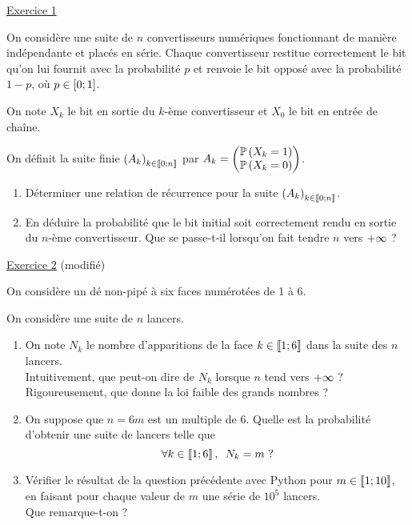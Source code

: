 \begin{corr}
\end{corr}

\begin{exo}
\underline{Exercice 1}

On considère une suite de \(n\) convertisseurs numériques fonctionnant de manière indépendante et placés en série. Chaque convertisseur restitue correctement le bit qu'on lui fournit avec la probabilité \(p\) et renvoie le bit opposé avec la probabilité \(1-p\), où \(p\in\left[0;1\right]\).

On note \(X_k\) le bit en sortie du \(k\)-ème convertisseur et \(X_0\) le bit en entrée de chaîne.

On définit la suite finie \(\left(A_k\right)_{k\in\left\llbracket0;n\right\rrbracket}\) par \(A_k=\begin{pmatrix}\mathbb{P}\left(X_k=1\right)\\\mathbb{P}\left(X_k=0\right)\end{pmatrix}\).

\begin{enumerate}
    \item Déterminer une relation de récurrence pour la suite \(\left(A_k\right)_{k\in\left\llbracket0;n\right\rrbracket}\). \\
    \item En déduire la probabilité que le bit initial soit correctement rendu en sortie du \(n\)-ème convertisseur. Que se passe-t-il lorsqu'on fait tendre \(n\) vers \(+\infty\) ?
\end{enumerate}

\underline{Exercice 2} (modifié)

On considère un dé non-pipé à six faces numérotées de 1 à 6.

On considère une suite de \(n\) lancers.

\begin{enumerate}
    \item On note \(N_k\) le nombre d'apparitions de la face \(k\in\left\llbracket1;6\right\rrbracket\) dans la suite des \(n\) lancers. \\ Intuitivement, que peut-on dire de \(N_k\) lorsque \(n\) tend vers \(+\infty\) ? \\ Rigoureusement, que donne la loi faible des grands nombres ? \\
    \item On suppose que \(n=6m\) est un multiple de \(6\). Quelle est la probabilité d'obtenir une suite de lancers telle que \[\quantifs{\forall k\in\interventierii{1}{6}}N_k=m\text{ ?}\]
    \item Vérifier le résultat de la question précédente avec Python pour \(m\in\left\llbracket1;10\right\rrbracket\), en faisant pour chaque valeur de \(m\) une série de \(10^5\) lancers. \\ Que remarque-t-on ?
\end{enumerate}
\end{exo}


